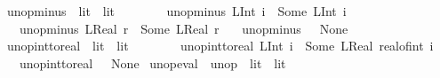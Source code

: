 \begin{isabellebody}
\isanewline
{}\isamarkupfalse%
\ unop{\isacharunderscore}{\kern0pt}minus\ {\isacharcolon}{\kern0pt}{\isacharcolon}{\kern0pt}\ {\isachardoublequoteopen}lit\ {\isasymrightharpoonup}\ lit{\isachardoublequoteclose}\isanewline
\ \ \ \isanewline
\ \ \ \ {\isachardoublequoteopen}unop{\isacharunderscore}{\kern0pt}minus\ {\isacharparenleft}{\kern0pt}LInt\ i{\isacharparenright}{\kern0pt}\ {\isacharequal}{\kern0pt}\ Some\ {\isacharparenleft}{\kern0pt}LInt\ {\isacharparenleft}{\kern0pt}{\isacharminus}{\kern0pt}i{\isacharparenright}{\kern0pt}{\isacharparenright}{\kern0pt}{\isachardoublequoteclose}\isanewline
\ \ {\isacharbar}{\kern0pt}\ {\isachardoublequoteopen}unop{\isacharunderscore}{\kern0pt}minus\ {\isacharparenleft}{\kern0pt}LReal\ r{\isacharparenright}{\kern0pt}\ {\isacharequal}{\kern0pt}\ Some\ {\isacharparenleft}{\kern0pt}LReal\ {\isacharparenleft}{\kern0pt}{\isacharminus}{\kern0pt}r{\isacharparenright}{\kern0pt}{\isacharparenright}{\kern0pt}{\isachardoublequoteclose}\isanewline
\ \ {\isacharbar}{\kern0pt}\ {\isachardoublequoteopen}unop{\isacharunderscore}{\kern0pt}minus\ {\isacharunderscore}{\kern0pt}\ {\isacharequal}{\kern0pt}\ None{\isachardoublequoteclose}\isanewline
\isanewline
{}\isamarkupfalse%
\ unop{\isacharunderscore}{\kern0pt}int{\isacharunderscore}{\kern0pt}to{\isacharunderscore}{\kern0pt}real\ {\isacharcolon}{\kern0pt}{\isacharcolon}{\kern0pt}\ {\isachardoublequoteopen}lit\ {\isasymrightharpoonup}\ lit{\isachardoublequoteclose}\isanewline
\ \ \ \isanewline
\ \ \ \ {\isachardoublequoteopen}unop{\isacharunderscore}{\kern0pt}int{\isacharunderscore}{\kern0pt}to{\isacharunderscore}{\kern0pt}real\ {\isacharparenleft}{\kern0pt}LInt\ i{\isacharparenright}{\kern0pt}\ {\isacharequal}{\kern0pt}\ Some\ {\isacharparenleft}{\kern0pt}LReal\ {\isacharparenleft}{\kern0pt}real{\isacharunderscore}{\kern0pt}of{\isacharunderscore}{\kern0pt}int\ i{\isacharparenright}{\kern0pt}{\isacharparenright}{\kern0pt}{\isachardoublequoteclose}\isanewline
\ \ {\isacharbar}{\kern0pt}\ {\isachardoublequoteopen}unop{\isacharunderscore}{\kern0pt}int{\isacharunderscore}{\kern0pt}to{\isacharunderscore}{\kern0pt}real\ {\isacharunderscore}{\kern0pt}\ {\isacharequal}{\kern0pt}\ None{\isachardoublequoteclose}\isanewline
\isanewline
{}\isamarkupfalse%
\ unop{\isacharunderscore}{\kern0pt}eval\ {\isacharcolon}{\kern0pt}{\isacharcolon}{\kern0pt}\ {\isachardoublequoteopen}unop\ {\isasymRightarrow}\ lit\ {\isasymrightharpoonup}\ lit{\isachardoublequoteclose}\isanewline
\ \ \ \isanewline

\end{isabellebody}
